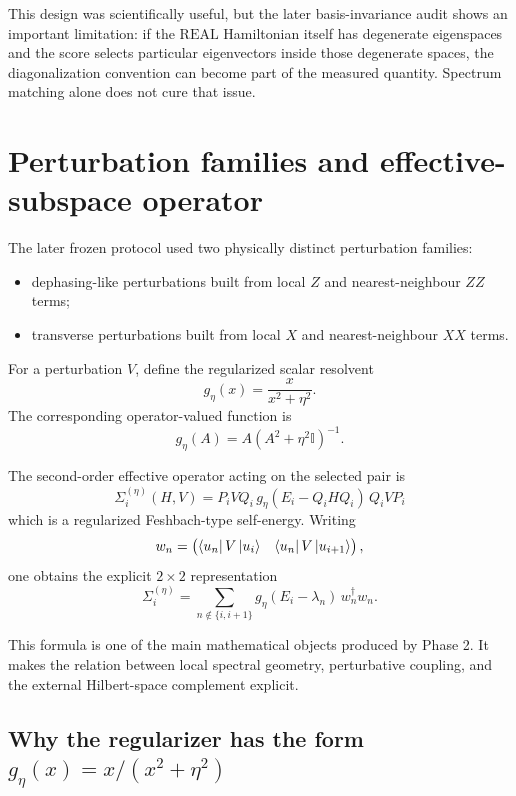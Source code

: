 \documentclass[11pt,a4paper]{article}
\newcommand{\Real}{\mathrm{REAL}}
\newcommand{\Id}{\mathbb I}
\begin{document}
This design was scientifically useful, but the later basis-invariance audit
shows an important limitation: if the \(\Real\) Hamiltonian itself has
degenerate eigenspaces and the score selects particular eigenvectors inside
those degenerate spaces, the diagonalization convention can become part of
the measured quantity.  Spectrum matching alone does not cure that issue.

\section{Perturbation families and effective-subspace operator}

The later frozen protocol used two physically distinct perturbation families:

\begin{itemize}
\item dephasing-like perturbations built from local \(Z\) and nearest-neighbour
      \(ZZ\) terms;
\item transverse perturbations built from local \(X\) and nearest-neighbour
      \(XX\) terms.
\end{itemize}

For a perturbation \(V\), define the regularized scalar resolvent
\[
g_\eta(x)=\frac{x}{x^2+\eta^2}.
\]
The corresponding operator-valued function is
\[
g_\eta(A)=A(A^2+\eta^2\Id)^{-1}.
\]

The second-order effective operator acting on the selected pair is
\[
\boxed{
\Sigma_i^{(\eta)}(H,V)
=
P_iVQ_i\,
g_\eta(E_i-Q_iHQ_i)\,
Q_iVP_i
}
\]
which is a regularized Feshbach-type self-energy.  Writing
\[
w_n=
\begin{pmatrix}
\bra{u_n}V\ket{u_i} &
\bra{u_n}V\ket{u_{i+1}}
\end{pmatrix},
\]
one obtains the explicit \(2\times2\) representation
\[
\Sigma_i^{(\eta)}
=
\sum_{n\notin\{i,i+1\}}
g_\eta(E_i-\lambda_n)\,w_n^\dagger w_n.
\]

This formula is one of the main mathematical objects produced by Phase 2.
It makes the relation between local spectral geometry, perturbative coupling,
and the external Hilbert-space complement explicit.


\subsection{Why the regularizer has the form \(g_\eta(x)=x/(x^2+\eta^2)\)}
\end{document}
